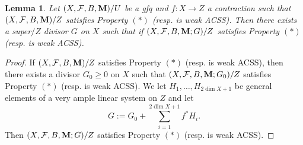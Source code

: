 \documentclass[11pt]{amsart}
\numberwithin{equation}{section}
\newcommand{\Mm}{{\bf{M}}}
\newcommand{\Ff}{\mathcal{F}}
\newtheorem{lem}[thm]{Lemma}
\theoremstyle{definition}
\theoremstyle{definition}
\theoremstyle{definition}
\begin{document}
\begin{lem}\label{lem: weak acss can be super}
    Let $(X,\Ff,B,\Mm)/U$ be a gfq and $f: X\rightarrow Z$ a contraction such that $(X,\Ff,B,\Mm)/Z$ satisfies Property $(*)$ (resp. is weak ACSS). Then there exists a super$/Z$ divisor $G$ on $X$ such that if $(X,\Ff,B,\Mm;G)/Z$ satisfies Property $(*)$ (resp. is weak ACSS).
\end{lem}
\begin{proof}
If $(X,\Ff,B,\Mm)/Z$ satisfies Property $(*)$ (resp. is weak ACSS), then there exists a divisor $G_0\geq 0$ on $X$ such that $(X,\Ff,B,\Mm;G_0)/Z$ satisfies Property $(*)$ (resp. is weak ACSS). We let $H_1,\dots,H_{2\dim X+1}$ be general elements of a very ample linear system on $Z$ and let $$G:=G_0+\sum_{i=1}^{2\dim X+1}f^*H_i.$$ 
Then $(X,\Ff,B,\Mm;G)/Z$ satisfies Property $(*)$ (resp. is weak ACSS).
\end{proof}
\end{document}
